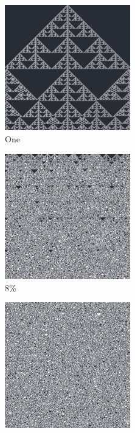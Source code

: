\documentclass[12pt, fleqn]{report}                             %
\theoremstyle{break}                                            %
\begin{document}
      \begin{figure}[ht!]
        \centering
        \begin{subfigure}[b]{0.4\linewidth}
          \includegraphics[width=0.6\textwidth]{Images/150/a.png}
          \caption{One}
        \end{subfigure}
        \begin{subfigure}[b]{0.4\linewidth}
          \includegraphics[width=0.6\textwidth]{Images/150/b.png}
          \caption{8\%}
        \end{subfigure}
        \begin{subfigure}[b]{0.4\linewidth}
          \includegraphics[width=0.6\textwidth]{Images/150/c.png}

\end{subfigure}
\end{figure}
\end{document}
